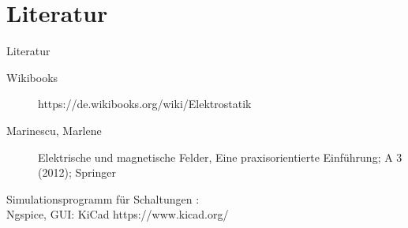 \documentclass[a4paper, 10pt]{scrartcl}
\begin{document}
\part{Literatur}
\begin{frame}{Literatur}
\begin{description}
  \item[Wikibooks] https://de.wikibooks.org/wiki/Elektrostatik
  \item[Marinescu, Marlene]  Elektrische und magnetische Felder,
  Eine praxisorientierte Einführung; A 3 (2012); Springer
\end{description}
Simulationsprogramm für Schaltungen :\\Ngspice, GUI: KiCad https://www.kicad.org/
\end{frame}

  \listoffigures


  \label{LastPage}
\end{document}
